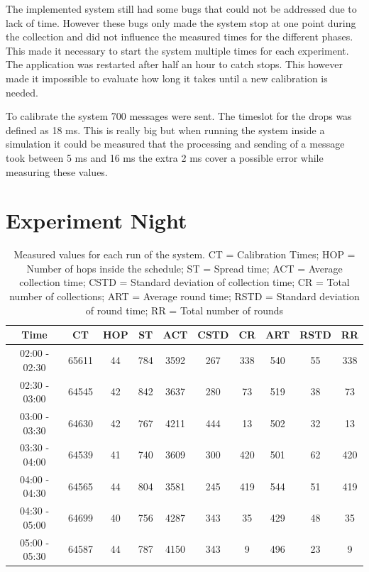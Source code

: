 The implemented system still had some bugs that could not be addressed due to lack of time. However these bugs only made the system stop at one point during the collection and did not influence the measured times for the different phases. This made it necessary to start the system multiple times for each experiment. The application was restarted after half an hour to catch stops. This however made it impossible to evaluate how long it takes until a new calibration is needed.

To calibrate the system 700 messages were sent. The timeslot for the drops was defined as 18 ms. This is really big but when running the system inside a simulation it could be measured that the processing and sending of a message took between 5 ms and 16 ms the extra 2 ms cover a possible error while measuring these values.  
\section{Experiment Night}
\begin{table}[htbp]
 \caption{Measured values for each run of the system. CT = Calibration Times; HOP = Number of hops inside the schedule; ST = Spread time; ACT = Average collection time; CSTD = Standard deviation of collection time; CR = Total number of collections; ART = Average round time; RSTD = Standard deviation of round time; RR = Total number of rounds}
 \centering
 \begin{tabular}{c||c|c|c|c|c|c|c|c|c}
  Time & CT & HOP & ST & ACT & CSTD & CR & ART & RSTD & RR\\ \toprule
  02:00 - 02:30 & 65611 & 44 & 784 & 3592 & 267 & 338 & 540 & 55 & 338\\
  02:30 - 03:00 & 64545 & 42 & 842 & 3637 & 280 & 73 & 519 & 38 & 73\\
  03:00 - 03:30 & 64630 & 42 & 767 & 4211 & 444 & 13 & 502 & 32 & 13\\
  03:30 - 04:00 & 64539 & 41 & 740 & 3609 & 300 & 420 & 501 & 62 & 420\\
  04:00 - 04:30 & 64565 & 44 & 804 & 3581 & 245 & 419 & 544 & 51 & 419\\
  04:30 - 05:00 & 64699 & 40 & 756 & 4287 & 343 & 35 & 429 & 48 & 35\\
  05:00 - 05:30 & 64587 & 44 & 787 & 4150 & 343 & 9 & 496 & 23 & 9\\
 \end{tabular}
 \label{tab:NightTable}
\end{table}


